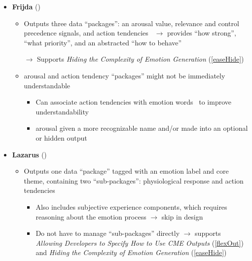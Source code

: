 \begin{itemize}
    \item \textbf{Frijda} (\good)
    \begin{itemize}
        \item Outputs three data ``packages'': an arousal value,
        relevance and control precedence signals, and action
        tendencies~\citep[p.~454--455]{frijda1986emotions} $\rightarrow$
        provides ``how strong'', ``what priority'', and an abstracted ``how to
        behave''

        \item [$\rightarrow$] Supports \textit{Hiding the Complexity of Emotion
            Generation} (\ref{easeHide})

        \item arousal and action tendency ``packages'' might not be
        immediately understandable
        \begin{itemize}
            \item Can associate action tendencies with emotion
            words~\citep[p.~72]{frijda1986emotions} to improve understandability

            \item arousal given a more recognizable name and/or made into
            an optional or hidden output
        \end{itemize}
    \end{itemize}

    \item \textbf{Lazarus} (\strong)
    \begin{itemize}
        \item Outputs one data ``package'' tagged with an emotion label and
        core theme, containing two ``sub-packages'': physiological response and
        action tendencies~\citep[p.~209--210]{lazarus1991emotion}
        \begin{itemize}
            \item Also includes subjective experience components, which
            requires reasoning about the emotion process $\rightarrow$ skip in
            design

            \item Do not have to manage ``sub-packages'' directly $\rightarrow$
            supports \textit{Allowing Developers to Specify How to Use CME
                Outputs} (\ref{flexOut}) and \textit{Hiding the Complexity of
                Emotion Generation} (\ref{easeHide})
        \end{itemize}
    \end{itemize}


\end{itemize}
